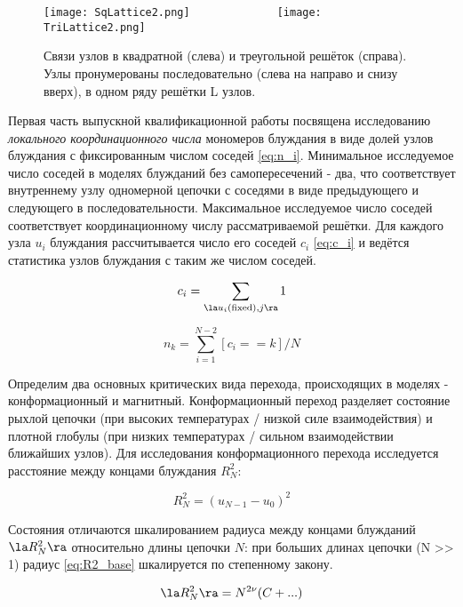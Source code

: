 \begin{figure}
    \centering
    \texttt{[image: SqLattice2.png]}\ \ \ \ \ \ \ \ \ \ \ \ \ \ 
    \texttt{[image: TriLattice2.png]}
    \caption{Связи узлов в квадратной (слева) и треугольной решёток (справа). 
	Узлы пронумерованы последовательно (слева на направо и снизу вверх), в одном ряду решётки L узлов.}
    \label{fig:lattices}
\end{figure}

Первая часть выпускной квалификационной работы посвящена исследованию \textit{локального координационного числа} мономеров блуждания
в виде долей узлов блуждания с фиксированным числом соседей \eqref{eq:n_i}.
Минимальное исследуемое число соседей в моделях блужданий без самопересечений - два, что соответствует внутреннему узлу одномерной цепочки с соседями в виде предыдующего и следующего в последовательности.
Максимальное исследуемое число соседей соответствует координационному числу рассматриваемой решётки. 
Для каждого узла $u_i$ блуждания рассчитывается число его соседей $c_i$ \eqref{eq:c_i} и ведётся статистика узлов блуждания с таким же числом соседей.

\begin{equation}
\label{eq:c_i}
c_i = \sum_{\la u_i \textup{(fixed)}, j \ra} 1
\end{equation}

\begin{equation}
\label{eq:n_i}
n_k = \sum_{i=1}^{N-2}[c_i == k] / N
\end{equation}

Определим два основных критических вида перехода, происходящих в моделях - конформационный и магнитный.
Конформационный переход разделяет состояние рыхлой цепочки (при высоких температурах / низкой силе взаимодействия) и плотной глобулы (при низких температурах / сильном взаимодействии ближайших узлов).
Для исследования конформационного перехода исследуется расстояние между концами блуждания $R^2_N$:

 
\begin{equation}
\label{eq:R2_base}
	R^2_N = (u_{N-1} - u_{0})^2
\end{equation}

Состояния отличаются шкалированием радиуса между концами блужданий $\la R^2_N \ra$ относительно длины цепочки $N$:
при больших длинах цепочки (N >> 1) радиус \eqref{eq:R2_base} шкалируется по степенному закону.

\begin{equation}
	\la R^2_N \ra = N^{2\nu}(C + ...)
\end{equation}

